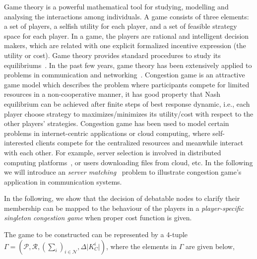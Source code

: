 \documentclass[10pt,journal,compsoc]{IEEEtran}
\theoremstyle{mytheoremstyle}
\theoremstyle{mytheoremstyle}
\theoremstyle{mytheoremstyle}
\newcommand{\ie}{i.e., }
\begin{document}
Game theory is a powerful mathematical tool for studying, modelling and analysing the interactions among individuals.
A game consists of three elements: a set of players, a selfish utility for each player, and a set of feasible strategy space for each player. In a game, the players are rational and intelligent decision makers, which are related with one explicit formalized incentive expression (the utility or cost).
Game theory provides standard procedures to study its equilibriums~\cite{game_for_communication_01}.
In the past few years, game theory has been extensively applied to problems in communication and networking~\cite{Neel06analysisand, Wang_gtc_crn_survey_2010}.
Congestion game is an attractive game model which describes the problem where participants compete for limited resources in a non-cooperative manner, it has good property that Nash equilibrium can be achieved after finite steps of best response dynamic, \ie each player choose strategy to maximizes/minimizes its utility/cost with respect to the other players' strategies.
Congestion game has been used to model certain problems in internet-centric applications or cloud computing, where self-interested clients compete for the centralized resources and meanwhile interact with each other.
For example, server selection is involved in distributed computing platforms~\cite{Cloud_Computing_2010}, or users downloading files from cloud, etc.
In the following we will introduce an \textit{server matching}~\cite{kothari:congestion_serverMatching} problem to illustrate congestion game's application in communication systems.


In the following, we show that the decision of debatable nodes to clarify their membership can be mapped to the behaviour of the players in a \textit{player-specific singleton congestion game} when proper cost function is given.

The game to be constructed can be represented by a 4-tuple $\Gamma=(\mathcal{P},\mathcal{R},(\sum_i)_{i \in \mathcal{N}},\Delta\vert K^i_C \vert)$, where the elements in $\Gamma$ are given below,
\end{document}
